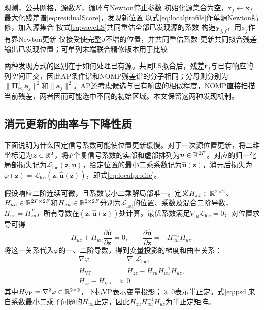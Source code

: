\begin{algorithm}[H]
\caption{波形消元块NOMP}\label{alg:nomp}
\begin{algorithmic}[1]
\Require 观测，公共网格，源数$K$，循环与Newton停止参数
\State 初始化源集合为空，$\bm r_f\gets\bm x_f$
  \State 最大化残差谱\eqref{eq:residualScore}，发现新位置
  \State 以式\eqref{eq:localprofile}作单源Newton精修，加入源集合
  \State 按式\eqref{eq:waveLS}共同重估全部已发现源的系数
  \Repeat
      \State 构造$\bm y_{j,f}$，用$\phi_j$作有界Newton更新
      \State 仅接受使完整$J$不增的位置，并共同重估系数
    \EndFor
  \State 更新共同拟合残差
\EndFor
\State 输出已发现位置；可单列末端联合精修版本用于比较
\end{algorithmic}
\end{algorithm}

两种发现方式的区别在于如何处理已有源。共同LS拟合后，残差$\bm r_f$与已有响应的列空间正交，因此AP条件谱和NOMP残差谱的分子相同；分母则分别为$\|\bm\Pi_{\bm B_f}^{\perp}\bm a_f\|^2$和$\|\bm a_f\|^2$。AP还考虑候选与已有响应的相似程度，NOMP直接扫描当前残差，两者因而可能选中不同的初始区域。本文保留这两种发现机制。

\subsection{消元更新的曲率与下降性质}\label{sec:curvature}
下面说明为什么固定信号系数可能使位置更新缓慢。对于一次源位置更新，将二维坐标记为$\bm z\in\mathbb R^2$，将$F$个复信号系数的实部和虚部排列为$\bm u\in\mathbb R^{2F}$。对应的归一化局部损失记为$\mathcal L_{\mathrm{loc}}(\bm z,\bm u)$，给定位置的最小二乘系数记为$\widehat{\bm u}(\bm z)$，消元后损失为$\varphi(\bm z)=\mathcal L_{\mathrm{loc}}(\bm z,\widehat{\bm u}(\bm z))$，即式\eqref{eq:localprofile}。

假设响应二阶连续可微，且系数最小二乘解局部唯一。定义$H_{zz}\in\mathbb R^{2\times2}$、$H_{uu}\in\mathbb R^{2F\times2F}$和$H_{zu}\in\mathbb R^{2\times2F}$分别为$\mathcal L_{\mathrm{loc}}$的位置、系数及混合二阶导数，$H_{uz}=H_{zu}^T$，所有导数在$(\bm z,\widehat{\bm u}(\bm z))$处计算。最优系数满足$\nabla_u\mathcal L_{\mathrm{loc}}=0$，对位置求导可得
\begin{equation}
 H_{uz}+H_{uu}\frac{\partial\widehat{\bm u}}{\partial\bm z}=0,
 \qquad\frac{\partial\widehat{\bm u}}{\partial\bm z}
 =-H_{uu}^{-1}H_{uz}.\label{eq:coefficientDerivative}
\end{equation}
将这一关系代入$\varphi$的一、二阶导数，得到变量投影的梯度和曲率关系\cite{GolubPereyra1973}：
\begin{align}
 \nabla\varphi&=\nabla_z\mathcal L_{\mathrm{loc}},\label{eq:envelope}\\
 H_{\mathrm{VP}}&=H_{zz}-H_{zu}H_{uu}^{-1}H_{uz},\label{eq:schur}\\
 H_{zz}-H_{\mathrm{VP}}&\succeq0 .\label{eq:psd}
\end{align}
其中$H_{\mathrm{VP}}=\nabla^2\varphi\in\mathbb R^{2\times2}$，下标VP表示变量投影；$\succeq0$表示半正定。式\eqref{eq:psd}来自系数最小二乘子问题的$H_{uu}$正定，因此$H_{zu}H_{uu}^{-1}H_{uz}$为半正定矩阵。

